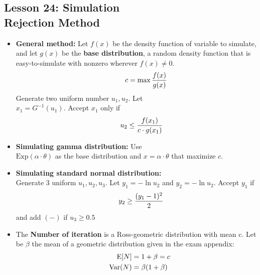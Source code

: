 \documentclass[10pt, french]{article}
\begin{document}
\begin{multicols*}{3}
\section*{Lesson 24: Simulation \\ Rejection Method}
\begin{itemize}[align=left,leftmargin=*]
    \item \textbf{General method:} Let $f(x)$ be the density function of variable to simulate, and let $g(x)$ be the \textbf{base distribution}, a random density function that is easy-to-simulate with nonzero wherever $f(x)\neq 0$. \[\hspace*{1cm} c = \max \frac{f(x)}{g(x)} \]
     Generate two uniform number $u_1, u_2$. Let \\ $x_1 = G^{-1}(u_1)$. Accept $x_1$ only if \[\hspace*{.5cm} u_2 \leq \frac{f(x_1)}{c \cdot g(x_1)} \]
    \item \textbf{Simulating gamma distribution:} Use \\ $\mathrm{Exp}(\alpha \cdot \theta)$ as the base distribution and $x = \alpha \cdot \theta$ that maximize $c$.
    \item \textbf{Simulating standard normal distribution:} \\ Generate 3 uniform $u_1, u_2, u_3$. Let $y_1 = -\ln u_2$ and $y_2 = -\ln u_2$. Accept $y_1$ if \[\hspace*{.5cm} y_2 \geq \frac{(y_1-1)^2}{2} \] and add $(-)$ if $u_3 \geq 0.5$
    \item  The \textbf{Number of iteration} is a Ross-geometric distribution with mean c. Let be $\beta$ the mean of a geometric distribution given in the exam appendix:
    \begin{align*}
    \hspace*{.7cm}
        \mathrm{E} {\left[ N \right]} &= 1 + \beta = c \\
        \mathrm{Var} {\left( N \right)} &= \beta(1+\beta)
    \end{align*}
\end{itemize}

\def\SectionColor{red!80!white}

\end{multicols*}
\end{document}
